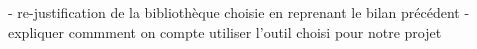 - re-justification de la bibliothèque choisie en reprenant le bilan précédent
- expliquer commment on compte utiliser l'outil choisi pour notre projet
